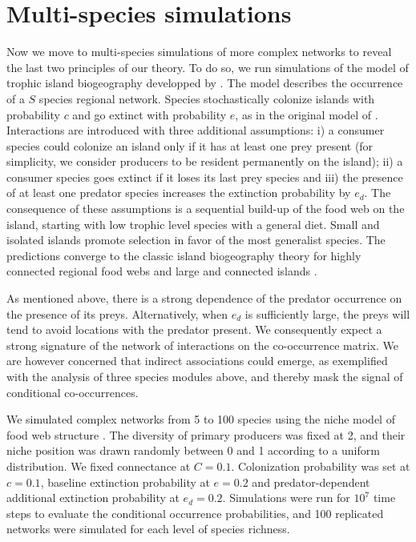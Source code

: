 \section*{Multi-species simulations}
\label{multi}

Now we move to multi-species simulations of more complex networks to reveal the
last two principles of our theory. To do so, we run simulations of the model of
trophic island biogeography developped by \cite{Gravel2011}. The model
describes the occurrence of a $S$ species regional network. Species stochastically
colonize islands with probability $c$ and go extinct with probability $e$, as in
the original model of \cite{MacArthur1967}. Interactions are introduced with
three additional assumptions: i) a consumer species could colonize an island
only if it has at least one prey present (for simplicity, we consider producers
to be resident permanently on the island); ii) a consumer species goes extinct
if it loses its last prey species and iii) the presence of at least one predator
species increases the extinction probability by $e_d$. The consequence of these
assumptions is a sequential build-up of the food web on the island, starting
with low trophic level species with a general diet. Small and isolated islands
promote selection in favor of the most generalist species. The predictions
converge to the classic island biogeography theory for highly connected regional
food webs and large and connected islands \citep[details in][]{Gravel2011}.

As mentioned above, there is a strong dependence of the predator
occurrence on the presence of its preys. Alternatively, when $e_d$ is
sufficiently large, the preys will tend to avoid locations with the predator
present. We consequently expect a strong signature of the network of
interactions on the co-occurrence matrix. We are however concerned that
indirect associations could emerge, as exemplified with the analysis of three
species modules above, and thereby mask the signal of conditional co-occurrences.

We simulated complex networks from 5 to 100 species using the niche model of
food web structure \citep{Williams2000}. The diversity of primary
producers was fixed at 2, and their niche position was drawn randomly between
0 and 1 according to a uniform distribution. We fixed connectance at $C =
0.1$. Colonization probability was set at $c = 0.1$, baseline extinction
probability at $e = 0.2$ and predator-dependent additional extinction
probability at $e_d = 0.2$. Simulations were run for $10^7$ time steps to
evaluate the conditional occurrence probabilities, and 100 replicated networks
were simulated for each level of species richness.

